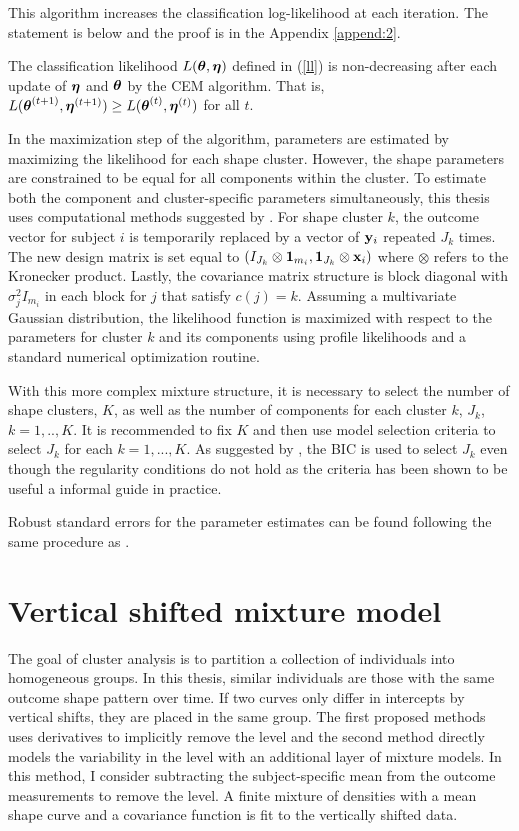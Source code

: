 This algorithm increases the classification log-likelihood at each iteration. The statement is below and the proof is in the Appendix \ref{append:2}. 
\begin{theorem} The classification likelihood $L(\boldsymbol\theta,\boldsymbol\eta)$ defined in (\ref{ll}) is non-decreasing after each update of $\boldsymbol\eta$ and $\boldsymbol\theta$ by the CEM algorithm. That is, $L(\boldsymbol\theta^{(t+1)},\boldsymbol\eta^{(t+1)}) \geq L(\boldsymbol\theta^{(t)},\boldsymbol\eta^{(t)})$ for all $t$.
\end{theorem}

In the maximization step of the algorithm, parameters are estimated by maximizing the likelihood for each shape cluster. However, the shape parameters are constrained to be equal for all components within the cluster. To estimate both the component and cluster-specific parameters simultaneously, this thesis uses computational methods suggested by \textcite{grun2008}. For shape cluster $k$, the outcome vector for subject $i$ is temporarily replaced by a vector of $\mathbf y_{i}$ repeated $J_{k}$ times. The new design matrix  is set equal to $(I_{J_{k}}\otimes \boldsymbol 1_{m_{i}}, \boldsymbol 1_{J_{k}} \otimes \mathbf x_{i})$ where $\otimes$ refers to the Kronecker product. Lastly, the covariance matrix structure is block diagonal with $\sigma^{2}_{j}I_{m_{i}}$ in each block for $j$ that satisfy $c(j)=k$. Assuming a multivariate Gaussian distribution, the likelihood function is maximized with respect to the parameters for cluster $k$ and its components using profile likelihoods and a standard numerical optimization routine.

With this more complex mixture structure, it is necessary to select the number of shape clusters, $K$, as well as the number of components for each cluster $k$, $J_{k}$, $k=1,..,K$. It is recommended to fix $K$ and then use model selection criteria to select $J_{k}$ for each $k=1,...,K$. As suggested by \textcite{li2005}, the BIC is used to select $J_{k}$ even though the regularity conditions do not hold as the criteria has been shown to be useful a informal guide in practice.

Robust standard errors for the parameter estimates can be found following the same procedure as \textcite{boldea2009}.

\section{Vertical shifted mixture model}
The goal of cluster analysis is to partition a collection of individuals into homogeneous groups. In this thesis, similar individuals are those with the same outcome shape pattern over time. If two curves only differ in intercepts by vertical shifts, they are placed in the same group. The first proposed methods uses derivatives to implicitly remove the level and the second method directly models the variability in the level with an additional layer of mixture models.  In this method, I consider subtracting the subject-specific mean from the outcome measurements to remove the level. A finite mixture of densities with a mean shape curve and a covariance function is fit to the vertically shifted data. 

